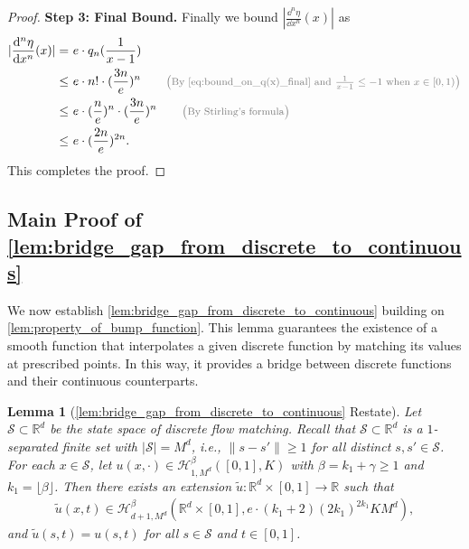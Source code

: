 \documentclass[12pt]{article}
\numberwithin{equation}{section}
\let\tilde\widetilde
\newcommand{\calS}{\mathcal{S}}
\newcommand{\wt}{\widetilde}
\renewcommand{\tilde}{\wt}
\def\R{\mathbb{R}}
\theoremstyle{theoremstyle}
\newtheorem{lemma}{Lemma}[section]
\numberwithin{equation}{section}
\numberwithin{theorem}{section}
\numberwithin{proposition}{section}
\numberwithin{definition}{section}
\numberwithin{lemma}{section}
\numberwithin{assumption}{section}
\numberwithin{remark}{section}
\newcommand*{\annot}[1]{\tag*{\footnotesize{\textcolor{black!50}{\big(#1\big)}}}}
\begin{document}
\begin{proof}
\textbf{Step 3: Final Bound.}
Finally we bound $|\frac{\dd^n\eta}{\dd x^n}(x)|$ as
\begin{align*}
    |\frac{\dd^n\eta}{\dd x^n}(x)| = & ~e\cdot q_n(\frac{1}{x-1}) \\
    \leq & ~
    e\cdot n!\cdot(\frac{3n}{e})^n \annot{By \eqref{eq:bound_on_q(x)_final} and $\frac{1}{x-1}\leq-1$ when $x\in[0,1)$}\\
    \leq & ~
    e\cdot(\frac{n}{e})^n\cdot(\frac{3n}{e})^n \annot{By Stirling's formula} \\
    \leq & ~
    e\cdot(\frac{2n}{e})^{2n}.
\end{align*}
This completes the proof.
\end{proof}


\subsection{Main Proof of \texorpdfstring{\cref{lem:bridge_gap_from_discrete_to_continuous}}{}}\label{sec:main_proof_bridge}



We now establish \cref{lem:bridge_gap_from_discrete_to_continuous} building on \cref{lem:property_of_bump_function}.
This lemma guarantees the existence of a smooth function that interpolates a given discrete function by matching its values at prescribed points.
In this way, it provides a bridge between discrete functions and their continuous counterparts.


\begin{lemma}[\cref{lem:bridge_gap_from_discrete_to_continuous} Restate]
\label{lem:bridge_gap_from_discrete_to_continuous_re}
Let $\mathcal{S}\subset\R^d$ be the state space of discrete flow matching.
Recall that $\calS \subset \R^d$ is a $1$-separated finite set with $|\calS|=M^d$, i.e., $\|s-s'\|\ge1$ for all distinct $s,s'\in\calS$.
For each $x\in\mathcal{S}$, 
let $u(x,\cdot)\in\mathcal{H}^\beta_{1,M^d}([0,1],K)$ with $\beta=k_1+\gamma\ge 1$ and $k_1=\lfloor\beta\rfloor$. 
Then there exists an extension $\tilde{u}:\R^d\times[0,1]\to\R$ such that
\begin{align*}
    \tilde{u}(x,t) \in \mathcal{H}^{\beta}_{d+1,M^d}(\R^{d}\times[0,1],e\cdot(k_1+2)(2k_1)^{2k_1} KM^d),
\end{align*}
and $\tilde{u}(s,t)=u(s,t)$ for all $s\in\mathcal{S}$ and $t\in[0,1]$.
\end{lemma}
\end{document}
